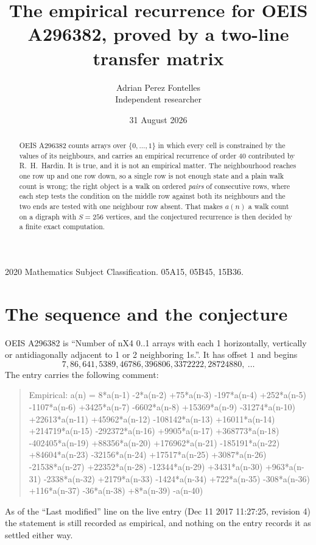 \documentclass[11pt,a4paper]{article}
\title{The empirical recurrence for OEIS A296382, proved by a two-line transfer matrix}
\author{Adrian Perez Fontelles\\ \small Independent researcher}
\date{31 August 2026}
\theoremstyle{plain}
\theoremstyle{definition}
\begin{document}
\maketitle

\begin{abstract}
OEIS A296382 counts arrays over $\{0,\dots,1\}$ in which every cell is constrained by the
values of its neighbours, and carries an empirical recurrence of order $40$ contributed
by R.~H.~Hardin. It is true, and it is not an empirical matter. The neighbourhood reaches one
row up and one row down, so a single row is not enough state and a plain walk count
is wrong; the right object is a walk on ordered \emph{pairs} of consecutive rows, where
each step tests the condition on the middle row against both its neighbours and the two
ends are tested with one neighbour row absent. That makes $a(n)$ a walk count on a digraph
with $S=256$ vertices, and the conjectured recurrence is then decided by a finite exact
computation.
\end{abstract}

\noindent\small 2020 Mathematics Subject Classification. 05A15, 05B45, 15B36.\normalsize

\section{The sequence and the conjecture}

OEIS A296382 is ``Number of nX4 0..1 arrays with each 1 horizontally, vertically or antidiagonally adjacent to 1 or 2 neighboring 1s.''. It has offset $1$ and begins
\[
7, 86, 641, 5389, 46786, 396806, 3372222, 28724880,\ \dots
\]
The entry carries the following comment:
\begin{quote}\small
Empirical: a(n) = 8*a(n-1) -2*a(n-2) +75*a(n-3) -197*a(n-4) +252*a(n-5) -1107*a(n-6) +3425*a(n-7) -6602*a(n-8) +15369*a(n-9) -31274*a(n-10) +22613*a(n-11) +45962*a(n-12) -108142*a(n-13) +16011*a(n-14) +214719*a(n-15) -292372*a(n-16) +9905*a(n-17) +368773*a(n-18) -402405*a(n-19) +88356*a(n-20) +176962*a(n-21) -185191*a(n-22) +84604*a(n-23) -32156*a(n-24) +17517*a(n-25) +3087*a(n-26) -21538*a(n-27) +22352*a(n-28) -12344*a(n-29) +3431*a(n-30) +963*a(n-31) -2338*a(n-32) +2179*a(n-33) -1424*a(n-34) +722*a(n-35) -308*a(n-36) +116*a(n-37) -36*a(n-38) +8*a(n-39) -a(n-40)
\end{quote}
As of the ``Last modified'' line on the live entry (Dec 11 2017 11:27:25, revision 4) the statement is
still recorded as empirical, and nothing on the entry records it as settled either way.
\end{document}
